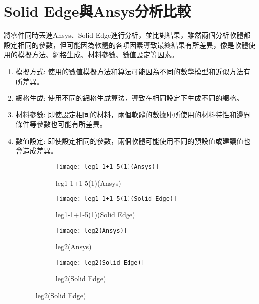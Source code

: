 \section{Solid Edge與Ansys分析比較}
將零件同時丟進Ansys、Solid Edge進行分析，並比對結果，雖然兩個分析軟體都設定相同的參數，但可能因為軟體的各項因素導致最終結果有所差異，像是軟體使用的模擬方法、網格生成、材料參數、數值設定等因素。\
\begin{enumerate}
\item 模擬方式: 使用的數值模擬方法和算法可能因為不同的數學模型和近似方法有所差異。
\item 網格生成: 使用不同的網格生成算法，導致在相同設定下生成不同的網格。
\item 材料參數: 即使設定相同的材料，兩個軟體的數據庫所使用的材料特性和邊界條件等參數也可能有所差異。
\item	數值設定: 即使設定相同的參數，兩個軟體可能使用不同的預設值或建議值也會造成差異。
\newpage

\begin{figure}[htbp]
  \centering
  \begin{minipage}[t]{0.48\textwidth}
    \centering
    \begin{subfigure}[t]{\textwidth}
      \centering
      \texttt{[image: leg1-1+1-5(1)(Ansys)]}
      \caption{leg1-1+1-5(1)(Ansys)}
      \label{leg1-1+1-5(1)(Ansys)}
    \end{subfigure}
    \vspace{0.5cm} %
    \begin{subfigure}[t]{\textwidth}
      \centering
      \texttt{[image: leg1-1+1-5(1)(Solid Edge)]}
      \caption{leg1-1+1-5(1)(Solid Edge)}
      \label{leg1-1+1-5(1)(Solid Edge)}
    \end{subfigure}
  \end{minipage}
  
  \vspace{0.5cm} %
  
  \begin{minipage}[t]{0.48\textwidth}
    \centering
    \begin{subfigure}[t]{\textwidth}
      \centering
      \texttt{[image: leg2(Ansys)]}
      \caption{leg2(Ansys)}
      \label{leg2(Ansys)}
    \end{subfigure}
    \vspace{0.5cm} %
    \begin{subfigure}[t]{\textwidth}
      \centering
      \texttt{[image: leg2(Solid Edge)]}
      \caption{leg2(Solid Edge)}
      \label{leg2(Solid Edge)}
    \end{subfigure}
  \end{minipage}
  

\end{figure}
\end{enumerate}
